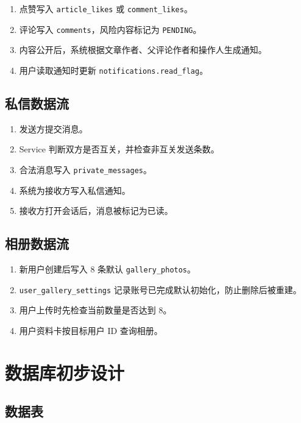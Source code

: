 \documentclass[UTF8,a4paper,12pt]{ctexart}
\begin{document}
\begin{enumerate}
  \item 点赞写入 \texttt{article\_likes} 或 \texttt{comment\_likes}。
  \item 评论写入 \texttt{comments}，风险内容标记为 \texttt{PENDING}。
  \item 内容公开后，系统根据文章作者、父评论作者和操作人生成通知。
  \item 用户读取通知时更新 \texttt{notifications.read\_flag}。
\end{enumerate}

\subsection{私信数据流}

\begin{enumerate}
  \item 发送方提交消息。
  \item Service 判断双方是否互关，并检查非互关发送条数。
  \item 合法消息写入 \texttt{private\_messages}。
  \item 系统为接收方写入私信通知。
  \item 接收方打开会话后，消息被标记为已读。
\end{enumerate}

\subsection{相册数据流}

\begin{enumerate}
  \item 新用户创建后写入 8 条默认 \texttt{gallery\_photos}。
  \item \texttt{user\_gallery\_settings} 记录账号已完成默认初始化，防止删除后被重建。
  \item 用户上传时先检查当前数量是否达到 8。
  \item 用户资料卡按目标用户 ID 查询相册。
\end{enumerate}

\section{数据库初步设计}

\subsection{数据表}
\end{document}
